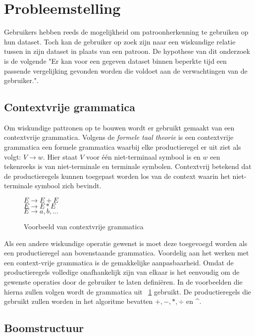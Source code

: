 \documentclass[Main.tex]{subfiles}
\begin{document}
\section{Probleemstelling}
Gebruikers hebben reeds de mogelijkheid om patroonherkenning te gebruiken op hun dataset. Toch kan de gebruiker op zoek zijn naar een wiskundige relatie tussen in zijn dataset in plaats van een patroon. De hypothese van dit onderzoek is de volgende "Er kan voor een gegeven dataset binnen beperkte tijd een passende vergelijking gevonden worden die voldoet aan de verwachtingen van de gebruiker.".

\subsection{Contextvrije grammatica}
Om wiskundige pattronen op te bouwen wordt er gebruikt gemaakt van een contextvrije grammatica. Volgens de \textit{formele taal theorie} \cite{cfg}
is een contextvrije grammatica een formele grammatica waarbij elke productieregel er uit ziet als volgt: $V \rightarrow w$. Hier staat $V$  voor \'e\'en niet-terminaal symbool is en $w$ een tekenreeks is van niet-terminale en terminale symbolen. Contextvrij betekend dat de productieregels kunnen toegepast worden los van de context waarin het niet-terminale symbool zich bevindt. \\

\begin{figure}[!htb]
\centering
\begin{framed}
$E \rightarrow E + E$ \\
$E \rightarrow E \ast E$ \\
$E \rightarrow a,b,\dotsc$
\end{framed}
\caption{Voorbeeld van contextvrije grammatica}
\label{fig:cfg}
\end{figure}

Als een andere wiskundige operatie gewenst is moet deze toegevoegd worden als een productieregel aan bovenstaande grammatica. Voordelig aan het werken met een context-vrije grammatica is de gemakkelijke aanpasbaarheid. Omdat de productieregels volledige onafhankelijk zijn van elkaar is het eenvoudig om de gewenste operaties door de gebruiker te laten defini\"eren. In de voorbeelden die hierna zullen volgen wordt de grammatica uit ~\ref{fig:cfg} gebruikt. De productieregels die gebruikt zullen worden in het algoritme bevatten $+, -, \ast, \div$ en \^{}.

\subsection{Boomstructuur}
\end{document}
